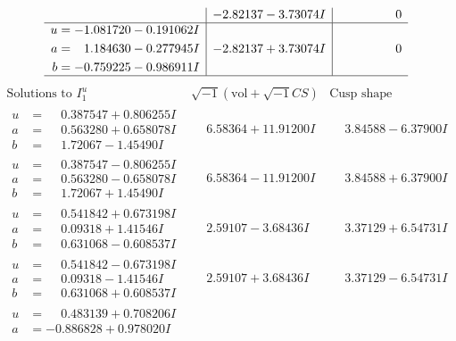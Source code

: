 \documentclass[1p]{elsarticle_modified}
\theoremstyle{definition}
\newcommand{\I}{\sqrt{-1}}
\begin{document}
$$\begin{array}{c|c|c}
 & -2.82137 - 3.73074 I & \phantom{-0.000000 } 0 \\ \hline\begin{aligned}
u &= -1.081720 - 0.191062 I \\
a &= \phantom{-}1.184630 - 0.277945 I \\
b &= -0.759225 - 0.986911 I\end{aligned}
 & -2.82137 + 3.73074 I & \phantom{-0.000000 } 0\\
 \hline 
 \end{array}$$\newpage$$\begin{array}{c|c|c}  
\text{Solutions to }I^u_{1}& \I (\text{vol} + \sqrt{-1}CS) & \text{Cusp shape}\\
 \hline 
\begin{aligned}
u &= \phantom{-}0.387547 + 0.806255 I \\
a &= \phantom{-}0.563280 + 0.658078 I \\
b &= \phantom{-}1.72067 - 1.45490 I\end{aligned}
 & \phantom{-}6.58364 + 11.91200 I & \phantom{-}3.84588 - 6.37900 I \\ \hline\begin{aligned}
u &= \phantom{-}0.387547 - 0.806255 I \\
a &= \phantom{-}0.563280 - 0.658078 I \\
b &= \phantom{-}1.72067 + 1.45490 I\end{aligned}
 & \phantom{-}6.58364 - 11.91200 I & \phantom{-}3.84588 + 6.37900 I \\ \hline\begin{aligned}
u &= \phantom{-}0.541842 + 0.673198 I \\
a &= \phantom{-}0.09318 + 1.41546 I \\
b &= \phantom{-}0.631068 - 0.608537 I\end{aligned}
 & \phantom{-}2.59107 - 3.68436 I & \phantom{-}3.37129 + 6.54731 I \\ \hline\begin{aligned}
u &= \phantom{-}0.541842 - 0.673198 I \\
a &= \phantom{-}0.09318 - 1.41546 I \\
b &= \phantom{-}0.631068 + 0.608537 I\end{aligned}
 & \phantom{-}2.59107 + 3.68436 I & \phantom{-}3.37129 - 6.54731 I \\ \hline\begin{aligned}
u &= \phantom{-}0.483139 + 0.708206 I \\
a &= -0.886828 + 0.978020 I \\

\end{aligned}
\end{array}$$
\end{document}
